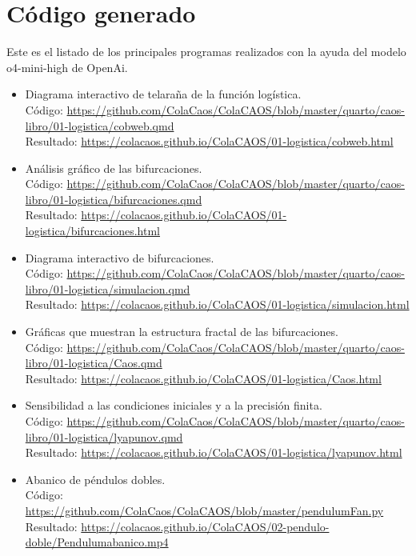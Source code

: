 \documentclass[
  10pt,
  a4paper,
  DIV=11,
  numbers=noendperiod,
  open=any]{scrreprt}
\numberwithin{equation}{chapter}
\numberwithin{equation}{section}
\renewcommand{\[}{\begin{equation}}
\renewcommand{\]}{\end{equation}}
\begin{document}
\section{Código generado}\label{cuxf3digo-generado}

Este es el listado de los principales programas realizados con la ayuda
del modelo o4-mini-high de OpenAi.

\begin{itemize}
\item
  Diagrama interactivo de telaraña de la función logística.\\
  Código: \url{https://github.com/ColaCaos/ColaCAOS/blob/master/quarto/caos-libro/01-logistica/cobweb.qmd}\\
  Resultado: \url{https://colacaos.github.io/ColaCAOS/01-logistica/cobweb.html}

\item
  Análisis gráfico de las bifurcaciones.\\
  Código: \url{https://github.com/ColaCaos/ColaCAOS/blob/master/quarto/caos-libro/01-logistica/bifurcaciones.qmd}\\
  Resultado: \url{https://colacaos.github.io/ColaCAOS/01-logistica/bifurcaciones.html}

\item
  Diagrama interactivo de bifurcaciones.\\
  Código: \url{https://github.com/ColaCaos/ColaCAOS/blob/master/quarto/caos-libro/01-logistica/simulacion.qmd}\\
  Resultado: \url{https://colacaos.github.io/ColaCAOS/01-logistica/simulacion.html}

\item
  Gráficas que muestran la estructura fractal de las bifurcaciones.\\
  Código: \url{https://github.com/ColaCaos/ColaCAOS/blob/master/quarto/caos-libro/01-logistica/Caos.qmd}\\
  Resultado: \url{https://colacaos.github.io/ColaCAOS/01-logistica/Caos.html}

\item
  Sensibilidad a las condiciones iniciales y a la precisión finita.\\
  Código: \url{https://github.com/ColaCaos/ColaCAOS/blob/master/quarto/caos-libro/01-logistica/lyapunov.qmd}\\
  Resultado: \url{https://colacaos.github.io/ColaCAOS/01-logistica/lyapunov.html}

\item
  Abanico de péndulos dobles.\\
  Código: \url{https://github.com/ColaCaos/ColaCAOS/blob/master/pendulumFan.py}\\
  Resultado: \url{https://colacaos.github.io/ColaCAOS/02-pendulo-doble/Pendulumabanico.mp4}


\end{itemize}
\end{document}
